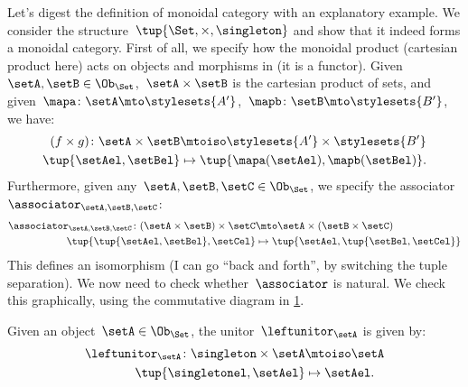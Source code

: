 \begin{example}
  Let's digest the definition of monoidal category with an explanatory example.
  We consider the structure~$\tup{\Set,\times,\singleton}$ and show that it indeed forms a monoidal category.
  First of all, we specify how the monoidal product (cartesian product here) acts on objects and morphisms in \Set (it is a functor).
  Given~$\setA,\setB\in \Ob_{\Set}$,~$\setA\times \setB$ is the cartesian product of sets, and given~$\mapa\colon \setA\mto \stylesets{A'}$,~$\mapb\colon \setB\mto \stylesets{B'}$, we have:
  \begin{equation*}
      \label{eq:set_mon_prod_2}
    \begin{aligned}
    (f\times g)
      \colon \setA\times \setB&\mtoiso \stylesets{A'}\times \stylesets{B'}\\
      \tup{\setAel,\setBel}&\mapsto \tup{\mapa(\setAel),\mapb(\setBel)}.
    \end{aligned}
  \end{equation*}
  Furthermore, given any~$\setA,\setB,\setC\in \Ob_{\Set}$, we specify the associator~$\associator_{\setA,\setB,\setC}$:
  \begin{equation*}
      \label{eq:set_mon_prod_3}
    \begin{aligned}
      \associator_{\setA,\setB,\setC}\colon (\setA\times \setB)\times \setC&\mto \setA\times (\setB\times \setC)\\
      \tup{\tup{\setAel,\setBel},\setCel}&\mapsto \tup{\setAel,\tup{\setBel,\setCel}}
    \end{aligned}
  \end{equation*}
  This defines an isomorphism (I can go ``back and forth'', by switching the tuple separation).
  We now need to check whether~$\associator$ is natural.
  We check this graphically, using the commutative diagram in \cref{fig:monoidal_set_ass_nat}.

  \begin{figure}[h!]
    \begin{center}
    \end{center}
    \caption{\label{fig:monoidal_set_ass_nat}}
  \end{figure}

  Given an object~$\setA\in \Ob_\Set$, the unitor~$\leftunitor_\setA$ is given by:
  \begin{equation*}
      \label{eq:set_mon_prod_4}
    \begin{aligned}
      \leftunitor_\setA\colon \singleton \times \setA &\mtoiso \setA\\
      \tup{\singletonel,\setAel}&\mapsto \setAel.
    \end{aligned}
  \end{equation*}


\end{example}
